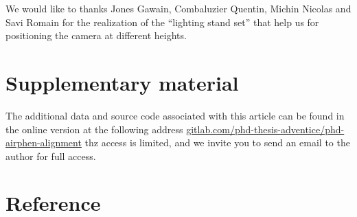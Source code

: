 \documentclass[]{elsarticle}
\begin{document}
	We would like to thanks Jones Gawain, Combaluzier Quentin, Michin Nicolas and Savi Romain
	for the realization of the ``lighting stand set'' that help us for positioning the camera at different heights.
	
	\section{Supplementary material}
	
	The additional data and source code associated with this article can be found in the online version at the following address
	\url{gitlab.com/phd-thesis-adventice/phd-airphen-alignment} thz access is limited,
	and we invite you to send an email to the author for full access.
	
	\section{Reference}
	
	
	
\end{document}
